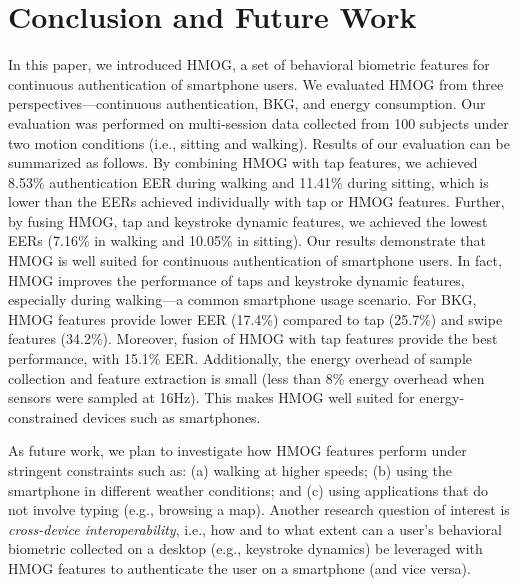 %
\section{Conclusion and Future Work}
\label{sec:conclusion}

In this paper, we introduced HMOG, a set of behavioral biometric features for continuous 
authentication of smartphone users.  We evaluated HMOG from three perspectives---continuous authentication, BKG, and energy consumption. Our evaluation was performed on multi-session data collected from 100 subjects under two motion conditions (i.e., sitting and walking). Results of our evaluation can be summarized as follows. By combining HMOG with tap features, we achieved 8.53\% authentication EER during walking and 11.41\% during sitting, which is lower than the EERs achieved individually with tap or HMOG features. Further, by fusing HMOG, tap and keystroke dynamic features, we achieved the lowest EERs (7.16\% in walking and 10.05\% in sitting). Our results demonstrate that HMOG is well suited for continuous authentication of smartphone users. In fact, HMOG improves the performance of taps and keystroke dynamic features, especially during walking---a common smartphone usage scenario.  For BKG, HMOG features provide lower EER (17.4\%) compared to tap (25.7\%) and swipe features (34.2\%). Moreover, fusion of HMOG with tap features provide the best performance, with 15.1\% EER. Additionally, the energy overhead of sample collection and feature extraction is small (less than 8\% energy overhead when sensors were sampled at 16Hz). This makes HMOG well suited for energy-constrained devices such as smartphones. 
%



%





%
%
%
%
%
%
As future work, we plan to investigate how HMOG features perform under stringent constraints such as: (a) walking at higher speeds; (b) using the smartphone in different weather conditions; and (c) using applications that do not involve typing (e.g., browsing a map). Another research question of interest is \textit{cross-device interoperability}, i.e., how and to what extent can a user's behavioral biometric collected on a desktop (e.g., keystroke dynamics) be leveraged with HMOG features to authenticate the user on a smartphone (and vice versa). 
%